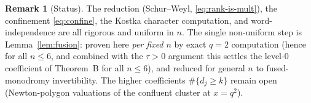 \documentclass[11pt]{article}
\theoremstyle{definition}
\newtheorem{remark}{Remark}
\begin{document}
\begin{remark}[Status]
The reduction (Schur--Weyl, \eqref{eq:rank-is-mult}), the confinement
\eqref{eq:confine}, the Kostka character computation, and word-independence are
all rigorous and uniform in $n$.  The single non-uniform step is
Lemma~\ref{lem:fusion}: proven here \emph{per fixed $n$} by exact $q=2$
computation (hence for all $n\le 6$, and combined with the $\tau>0$ argument this
settles the level-$0$ coefficient of Theorem~B for all $n\le 6$), and reduced for
general $n$ to fused-monodromy invertibility.  The higher coefficients
$\#\{d_j\ge k\}$ remain open (Newton-polygon valuations of the confluent cluster
at $x=q^2$).
\end{remark}
\end{document}
